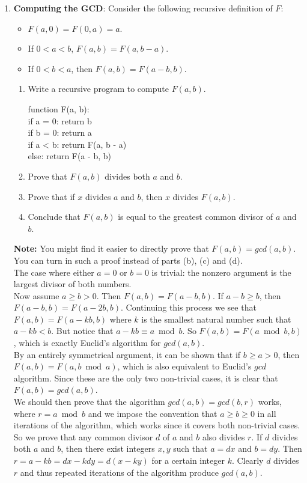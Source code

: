 \documentclass[11pt,fleqn]{article}
\begin{document}
\begin{enumerate}
\newpage
\item \textbf{Computing the GCD}: Consider the following recursive definition of $F$:
\begin{itemize}
\item $F(a, 0) = F(0,a) = a$.
\item If $0 < a < b$, $F(a, b) = F(a, b-a)$.
\item If $0 < b < a$, then $F(a, b) = F(a-b, b)$.
\end{itemize}
\begin{enumerate}
\item Write a recursive program to compute $F(a,b)$. \\
\begin{tabbing}
function F(a, b): \\
\hspace{1cm} if a = 0: return b \\
\hspace{1cm} if b = 0: return a \\
\hspace{1cm} if a < b: return F(a, b - a) \\
\hspace{1cm} else: return F(a - b, b)
\end{tabbing}
\item Prove that $F(a, b)$ divides both $a$ and $b$.
\item Prove that if $x$ divides $a$ and $b$, then $x$ divides $F(a, b)$.
\item Conclude that $F(a, b)$ is equal to the greatest common divisor of $a$ and $b$. 
\end{enumerate}
{\bf Note:} You might find it easier to directly prove that $F(a, b) = gcd(a,b)$.
You can turn in such a proof instead of parts (b), (c) and (d). \\
The case where either $a=0$ or $b=0$ is trivial: the nonzero argument is the largest divisor of both numbers. \\
Now assume $a \geq b > 0$. Then $F(a,b) = F(a-b,b)$. If $a-b \geq b$, then $F(a-b,b) = F(a-2b,b)$. Continuing this process we see that $F(a,b) = F(a-kb,b)$ where $k$ is the smallest natural number such that $a-kb < b$. But notice that $a-kb \equiv a \bmod b$. So $F(a,b) = F(a \bmod b, b)$, which is exactly Euclid's algorithm for $gcd(a,b)$. \\
By an entirely symmetrical argument, it can be shown that if $b \geq a > 0$, then $F(a,b) = F(a, b \bmod a)$, which is also equivalent to Euclid's $gcd$ algorithm. Since these are the only two non-trivial cases, it is clear that $F(a,b) = gcd(a,b)$. \\
We should then prove that the algorithm $gcd(a,b) = gcd(b,r)$ works, where $r = a \bmod b$ and we impose the convention that $a \geq b \geq 0$ in all iterations of the algorithm, which works since it covers both non-trivial cases. So we prove that any common divisor $d$ of $a$ and $b$ also divides $r$. If $d$ divides both $a$ and $b$, then there exist integers $x,y$ such that $a=dx$ and $b=dy$. Then $r = a-kb = dx - kdy = d(x-ky)$ for a certain integer $k$. Clearly $d$ divides $r$ and thus repeated iterations of the algorithm produce $gcd(a,b)$.


\end{enumerate}
\end{document}
